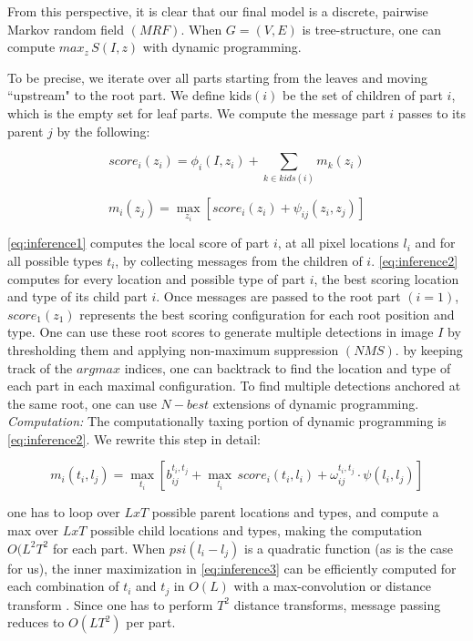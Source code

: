 From this perspective, it is clear that our final model is a discrete, pairwise Markov
random field $(MRF)$. When $G=(V,E)$ is tree-structure, one can compute $max_z\, S(I,z)$ 
with dynamic programming.

To be precise, we iterate over all parts starting from the leaves and moving ``upstream"
to the root part. We define kids$(i)$ be the set of children of part $i$, which is
the empty set for leaf parts. We compute the message part $i$ passes to its parent $j$
by the following:

\begin{equation}
\label{eq:inference1}
score_i(z_i)=\phi_i(I,z_i) + \sum_{k\in kids(i)} m_k(z_i)
\end{equation}

\begin{equation}
\label{eq:inference2}
m_i(z_j)=\max\limits_{z_i}\left[score_i(z_i) + \psi_{ij}(z_i,z_j)\right]
\end{equation}

\ref{eq:inference1} computes the local score of part $i$, at all pixel locations $l_i$ 
and for all possible types $t_i$, by collecting messages from the children of $i$. 
\ref{eq:inference2} computes for every location and possible type of part $i$, the
best scoring location and type of its child part $i$. Once messages are passed to the 
root part $(i=1)$, $score_1(z_1)$ represents the best scoring configuration for each 
root position and type. One can use these root scores to generate multiple detections in
 image $I$ by thresholding them and applying non-maximum suppression $(NMS)$. by keeping 
 track of the $argmax$ indices, one can backtrack to find the location and type of each 
 part in each maximal configuration. To find multiple detections anchored at the same 
 root, one can use $N-best$ extensions of dynamic programming.
\textit{Computation:} The computationally taxing portion of dynamic programming is 
\ref{eq:inference2}. We rewrite this step in detail:

\begin{equation}
\label{eq:inference3}
m_i(t_i, l_j) = \max\limits_{t_i}\left[b_{ij}^{t_i,t_j}+ \max\limits_{l_i}\, score_i(t_i,l_i)+\omega_{ij}^{t_i,t_j} \cdot \psi(l_i,l_j)\right] 
\end{equation}

one has to loop over $LxT$ possible parent locations and types, and compute a max 
over $LxT$ possible child locations and types, making the computation $O(L^2T^2$ 
for each part. When $psi(l_i-l_j)$ is a quadratic function (as is the case for us), 
the inner maximization in \ref{eq:inference3} can be efficiently computed for each
combination of $t_i$ and $t_j$ in $O(L)$ with a max-convolution or distance transform
\citet{Felzenszwalb2005}. Since one has to perform $T^2$ distance transforms, message passing
reduces to $O(LT^2)$ per part.



